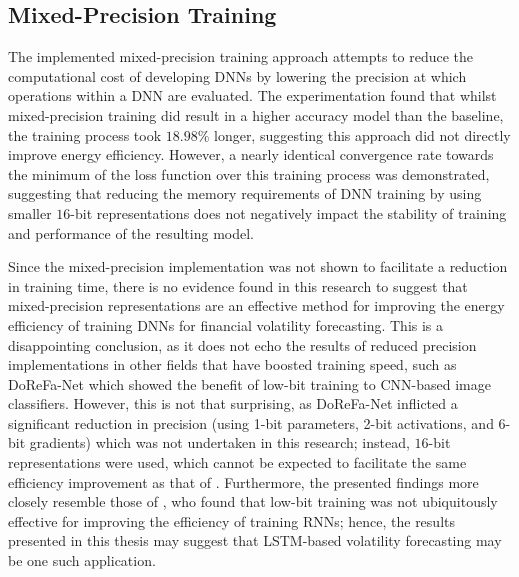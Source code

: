 \documentclass[a4paper, 11pt]{report}
\begin{document}
    \subsection{Mixed-Precision Training}

    The implemented mixed-precision training approach attempts to reduce the computational cost of developing DNNs by lowering the precision at which operations within a DNN are evaluated. The experimentation found that whilst mixed-precision training did result in a higher accuracy model than the baseline, the training process took $18.98\%$ longer, suggesting this approach did not directly improve energy efficiency. However, a nearly identical convergence rate towards the minimum of the loss function over this training process was demonstrated, suggesting that reducing the memory requirements of DNN training by using smaller $16$-bit representations does not negatively impact the stability of training and performance of the resulting model.

    Since the mixed-precision implementation was not shown to facilitate a reduction in training time, there is no evidence found in this research to suggest that mixed-precision representations are an effective method for improving the energy efficiency of training DNNs for financial volatility forecasting. This is a disappointing conclusion, as it does not echo the results of reduced precision implementations in other fields that have boosted training speed, such as DoReFa-Net \citep{zhou-2016} which showed the benefit of low-bit training to CNN-based image classifiers. However, this is not that surprising, as DoReFa-Net inflicted a significant reduction in precision (using 1-bit parameters, 2-bit activations, and 6-bit gradients) which was not undertaken in this research; instead, $16$-bit representations were used, which cannot be expected to facilitate the same efficiency improvement as that of \citet{zhou-2016}. Furthermore, the presented findings more closely resemble those of \citet{ott-2017}, who found that low-bit training was not ubiquitously effective for improving the efficiency of training RNNs; hence, the results presented in this thesis may suggest that LSTM-based volatility forecasting may be one such application.
\end{document}
